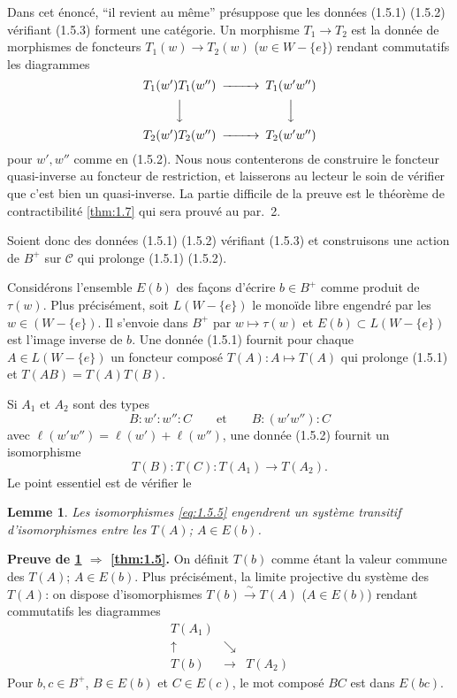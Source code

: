 \documentclass[11pt,a4paper]{article}
\theoremstyle{plain}
\newtheorem{lemma}[theorem]{Lemme}
\theoremstyle{definition}
\newcommand{\cC}{\mathscr{C}}
\begin{document}
Dans cet \'enonc\'e, ``il revient au m\^eme'' pr\'esuppose que les donn\'ees (1.5.1) (1.5.2) v\'erifiant (1.5.3) forment une cat\'egorie. Un morphisme $T_1 \to T_2$ est la donn\'ee de morphismes de foncteurs $T_1(w) \to T_2(w)$ ($w \in W - \{e\}$) rendant commutatifs les diagrammes
\[
\begin{CD}
T_1(w') T_1(w'') @>>> T_1(w'w'') \\
@VVV @VVV \\
T_2(w') T_2(w'') @>>> T_2(w'w'')
\end{CD}
\]
pour $w', w''$ comme en (1.5.2). Nous nous contenterons de construire le foncteur quasi-inverse au foncteur de restriction, et laisserons au lecteur le soin de v\'erifier que c'est bien un quasi-inverse. La partie difficile de la preuve est le th\'eor\`eme de contractibilit\'e \ref{thm:1.7} qui sera prouv\'e au par.~2.

Soient donc des donn\'ees (1.5.1) (1.5.2) v\'erifiant (1.5.3) et construisons une action de $B^+$ sur $\cC$ qui prolonge (1.5.1) (1.5.2).

Consid\'erons l'ensemble $E(b)$ des fa\c{c}ons d'\'ecrire $b \in B^+$ comme produit de $\tau(w)$. Plus pr\'ecis\'ement, soit $L(W - \{e\})$ le mono\"ide libre engendr\'e par les $w \in (W - \{e\})$. Il s'envoie dans $B^+$ par $w \mapsto \tau(w)$ et $E(b) \subset L(W - \{e\})$ est l'image inverse de $b$. Une donn\'ee (1.5.1) fournit pour chaque $A \in L(W - \{e\})$ un foncteur compos\'e $T(A) : A \mapsto T(A)$ qui prolonge (1.5.1) et $T(AB) = T(A)T(B)$.

Si $A_1$ et $A_2$ sont des types
\begin{equation}\label{eq:1.5.4}
B : w' : w'' : C \qquad \text{et} \qquad B : (w'w'') : C
\end{equation}
avec $\ell(w'w'') = \ell(w') + \ell(w'')$, une donn\'ee (1.5.2) fournit un isomorphisme
\begin{equation}\label{eq:1.5.5}
T(B) : T(C) : T(A_1) \to T(A_2).
\tag{1.5.5}
\end{equation}
Le point essentiel est de v\'erifier le

\begin{lemma}\label{lem:1.6}
Les isomorphismes \eqref{eq:1.5.5} engendrent un syst\`eme transitif d'isomorphismes entre les $T(A)$; $A \in E(b)$.
\end{lemma}

\noindent\textbf{Preuve de \ref{lem:1.6} $\Rightarrow$ \ref{thm:1.5}.} On d\'efinit $T(b)$ comme \'etant la valeur commune des $T(A)$; $A \in E(b)$. Plus pr\'ecis\'ement, la limite projective du syst\`eme des $T(A)$: on dispose d'isomorphismes $T(b) \xrightarrow{\;\sim\;} T(A)$ ($A \in E(b)$) rendant commutatifs les diagrammes
\[
\begin{array}{ccc}
T(A_1) & & \\
\uparrow & \searrow & \\
T(b) & \longrightarrow & T(A_2)
\end{array}
\]
Pour $b, c \in B^+$, $B \in E(b)$ et $C \in E(c)$, le mot compos\'e $BC$ est dans $E(bc)$.
\end{document}
